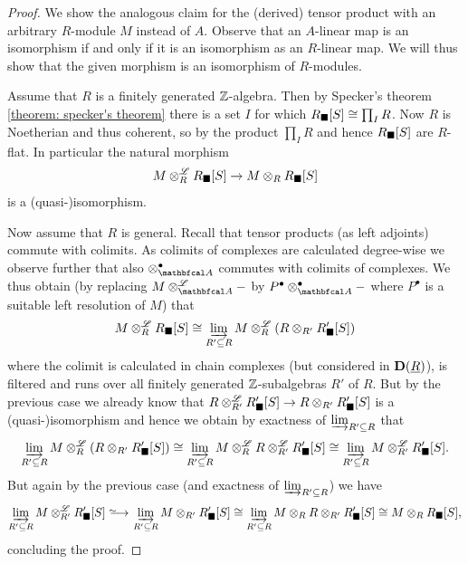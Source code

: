 \begin{proof}
	We show the analogous claim for the (derived) tensor product with an arbitrary $R$-module $M$ instead of $A$. Observe that an $A$-linear map is an isomorphism if and only if it is an isomorphism as an $R$-linear map. We will thus show that the given morphism is an isomorphism of $R$-modules.
	
	Assume that $R$ is a finitely generated ${\mathbb{Z}}$-algebra. Then by Specker's theorem \ref{theorem: specker's theorem} there is a set $I$ for which ${R_\blacksquare[S]}\cong \prod_I R$. Now $R$ is Noetherian and thus coherent, so by \cite[\href{https://stacks.math.columbia.edu/tag/05CZ}{Tag 05CZ}]{stacks-project} the product $\prod_I R$ and hence ${R_\blacksquare[S]}$ are $R$-flat. In particular the natural morphism
		$$M\otimes^{\mathscr{L}}_R {R_\blacksquare[S]} \to M\otimes_R {R_\blacksquare[S]}$$
	is a (quasi-)isomorphism.
	
	Now assume that $R$ is general. Recall that tensor products (as left adjoints) commute with colimits. As colimits of complexes are calculated degree-wise we observe further that also $\otimes_\category{A}^\bullet$ commutes with colimits of complexes. We thus obtain (by replacing $M\Dotimes_\category{A} -$ by $P^\bullet\otimes_\category{A}^\bullet -$ where $P^\bullet$ is a suitable left resolution of $M$) that
		$$M\otimes^{\mathscr{L}}_R {R_\blacksquare[S]} \cong \varinjlim_{R'\subseteq R} M \otimes^{\mathscr{L}}_R (R \otimes_{R'} {R'_\blacksquare[S]})$$
	where the colimit is calculated in chain complexes (but considered in ${{\mathbf{D}}(\underline{R})}$), is filtered and runs over all finitely generated ${\mathbb{Z}}$-subalgebras $R'$ of $R$. But by the previous case we already know that $R\otimes^{\mathscr{L}}_{R'}{R'_\blacksquare[S]} \to R\otimes_{R'}{R'_\blacksquare[S]}$ is a (quasi-)isomorphism and hence we obtain by exactness of $\varinjlim_{R'\subseteq R}$ that
		$$\varinjlim_{R'\subseteq R} M \otimes^{\mathscr{L}}_R (R \otimes_{R'} {R'_\blacksquare[S]})\cong \varinjlim_{R'\subseteq R} M \otimes^{\mathscr{L}}_R R \otimes^{\mathscr{L}}_{R'} {R'_\blacksquare[S]}\cong \varinjlim_{R'\subseteq R} M \otimes^{\mathscr{L}}_{R'} {R'_\blacksquare[S]}.$$
	But again by the previous case (and exactness of $\varinjlim_{R'\subseteq R}$) we have
		$$\colimit_{R'\subseteq R} M\Dotimes_{R'} \free{R'_\blacksquare}{S} \isorightarrow \colimit_{R'\subseteq R} M\otimes_{R'} \free{R'_\blacksquare}{S}\cong \colimit_{R'\subseteq R} M\otimes_R R\otimes_{R'} \free{R'_\blacksquare}{S} \cong M\otimes_R \free{R_\blacksquare}{S},$$
	concluding the proof.
	

\end{proof}
